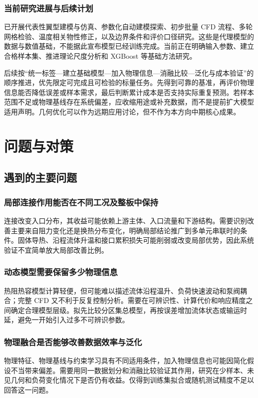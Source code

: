 \documentclass[stage2,UTF8,fontset=fandol]{ydzjreport}
\begin{document}
\subsubsection{当前研究进展与后续计划}
已开展代表性翼型建模与仿真、参数化自动建模探索、初步批量 CFD 流程、多轮网格检验、温度相关物性修正，以及边界条件和评价口径研究。这些是代理模型的数据与数值基础，不能据此宣布模型已经训练完成。当前正在明确输入参数、建立合格样本集、推进理论尺度分析和 XGBoost 等基础方法研究。

后续按“统一标签—建立基础模型—加入物理信息—消融比较—泛化与成本验证”的顺序推进，优先限定可完成且可检验的标量任务。先得到可靠的基准，再评价物理信息能否降低误差或样本需求，最后判断累计成本是否支持实际重复预测。若样本范围不足或物理基线存在系统偏差，应收缩用途或补充数据，而不是提前扩大模型适用声明。几何优化可以作为远期应用讨论，但不作为本方向中期核心成果。
\section{问题与对策}
\subsection{遇到的主要问题}

\subsubsection{局部连接作用能否在不同工况及整板中保持}
连接改变入口分布，其收益可能依赖上游主体、入口流量和下游结构。需要识别改善主要来自阻力变化还是换热分布变化，明确局部结论推广到多单元串联时的条件。固体导热、沿程流体升温和接口累积损失可能削弱或改变局部优势，因此系统验证不宜简单放大局部改善比例。

\subsubsection{动态模型需要保留多少物理信息}
热阻热容模型计算轻便，但可能难以描述流体沿程温升、负荷快速波动和泵阀耦合；完整 CFD 又不利于反复控制分析。需要在可辨识性、计算代价和响应精度之间确定合理模型层级。拟先比较分区集总模型，再按误差增加流体状态或输运时延，避免一开始引入过多不可辨识参数。

\subsubsection{物理融合是否能够改善数据效率与泛化}
物理特征、物理基线与约束学习具有不同适用条件，加入物理信息也可能因简化假设不当带来偏差。需要用同一数据划分和消融比较验证其作用，研究在少样本、未见几何和负荷变化情况下是否仍有收益。仅得到训练集拟合或随机测试精度不足以回答这一问题。
\end{document}
